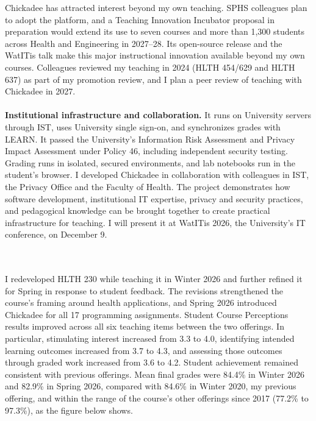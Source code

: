 \documentclass[11pt]{article}
\begin{document}
Chickadee has attracted interest beyond my own teaching. SPHS colleagues plan to adopt the platform, and a Teaching Innovation Incubator proposal in preparation would extend its use to seven courses and more than 1,300 students across Health and Engineering in 2027--28. Its open-source release and the WatITis talk make this major instructional innovation available beyond my own courses. Colleagues reviewed my teaching in 2024 (HLTH 454/629 and HLTH 637) as part of my promotion review, and I plan a peer review of teaching with Chickadee in 2027.
\\ \\
\textbf{Institutional infrastructure and collaboration.} It runs on University servers through IST, uses University single sign-on, and synchronizes grades with LEARN. It passed the University's Information Risk Assessment and Privacy Impact Assessment under Policy 46, including independent security testing. Grading runs in isolated, secured environments, and lab notebooks run in the student's browser. I developed Chickadee in collaboration with colleagues in IST, the Privacy Office and the Faculty of Health. The project demonstrates how software development, institutional IT expertise, privacy and security practices, and pedagogical knowledge can be brought together to create practical infrastructure for teaching. I will present it at WatITis 2026, the University's IT conference, on December 9.

\sectionbreak
{}
\\ \\
I redeveloped HLTH 230 while teaching it in Winter 2026 and further refined it for Spring in response to student feedback. The revisions strengthened the course's framing around health applications, and Spring 2026 introduced Chickadee for all 17 programming assignments. Student Course Perceptions results improved across all six teaching items between the two offerings. In particular, stimulating interest increased from 3.3 to 4.0, identifying intended learning outcomes increased from 3.7 to 4.3, and assessing those outcomes through graded work increased from 3.6 to 4.2. Student achievement remained consistent with previous offerings. Mean final grades were 84.4\% in Winter 2026 and 82.9\% in Spring 2026, compared with 84.6\% in Winter 2020, my previous offering, and within the range of the course's other offerings since 2017 (77.2\% to 97.3\%), as the figure below shows.
\\ \\

\fi %
\end{document}
